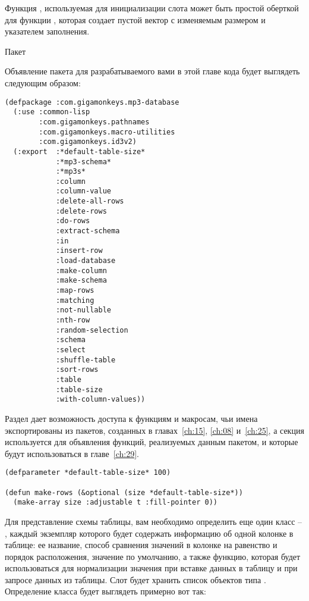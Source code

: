 Функция , используемая для инициализации слота  может быть
простой оберткой для функции , которая создает пустой вектор с изменяемым
размером и указателем заполнения.

Пакет

Объявление пакета для разрабатываемого вами в этой главе кода будет выглядеть следующим образом:

\begin{lstlisting}
(defpackage :com.gigamonkeys.mp3-database
  (:use :common-lisp 
        :com.gigamonkeys.pathnames
        :com.gigamonkeys.macro-utilities
        :com.gigamonkeys.id3v2)
  (:export  :*default-table-size*
            :*mp3-schema*
            :*mp3s*
            :column
            :column-value
            :delete-all-rows
            :delete-rows
            :do-rows
            :extract-schema
            :in
            :insert-row
            :load-database
            :make-column
            :make-schema
            :map-rows
            :matching
            :not-nullable
            :nth-row
            :random-selection
            :schema
            :select
            :shuffle-table
            :sort-rows
            :table
            :table-size
            :with-column-values))
\end{lstlisting}

Раздел  дает возможность доступа к функциям и макросам, чьи имена
экспортированы из пакетов, созданных в главах~\ref{ch:15}, \ref{ch:08} и~\ref{ch:25}, а
секция  используется для объявления функций, реализуемых данным пакетом, и
которые будут использоваться в главе~\ref{ch:29}.


\begin{lstlisting}
(defparameter *default-table-size* 100)

(defun make-rows (&optional (size *default-table-size*))
  (make-array size :adjustable t :fill-pointer 0))
\end{lstlisting}

Для представление схемы таблицы, вам необходимо определить еще один класс --
, каждый экземпляр которого будет содержать информацию об одной колонке в
таблице: ее название, способ сравнения значений в колонке на равенство и порядок
расположения, значение по умолчанию, а также функцию, которая будет использоваться для
нормализации значения при вставке данных в таблицу и при запросе данных из таблицы. Слот
 будет хранить список объектов типа .  Определение класса будет
выглядеть примерно вот так:

